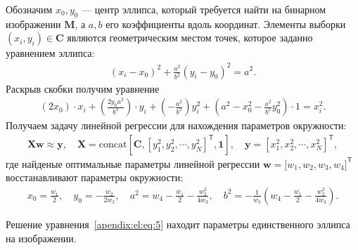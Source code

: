 \documentclass[12pt, twoside]{article}
\numberwithin{equation}{section}
\begin{document}
Обозначим $x_0, y_0$ --- центр эллипса, который требуется найти на бинарном изображении $\textbf{M}$, а $a, b$ его коэффициенты вдоль координат. Элементы выборки $\left(x_i, y_i\right)\in\textbf{C}$ являются геометрическим местом точек, которое заданно уравнением эллипса:
\begin{equation}
\label{apendix:el:eq:3}
\begin{aligned}
\left(x_i - x_0\right)^{2}+\frac{a^2}{b^2}\left(y_i-y_0\right)^2 = a^2.
\end{aligned}
\end{equation}
Раскрыв скобки получим уравнение
\begin{equation}
\label{apendix:el:eq:4}
\begin{aligned}
\left(2x_0\right)\cdot x_i + \left(\frac{2y_0a^2}{b^2}\right)\cdot y_i + \left(-\frac{a^2}{b^2}\right)y_{i}^{2} + \left(a^2-x_0^2-\frac{a^2}{b^2}y_0^2\right)\cdot1 = x_{i}^2.
\end{aligned}
\end{equation}
Получаем задачу линейной регрессии для нахождения параметров окружности:
\begin{equation}
\label{apendix:el:eq:5}
\begin{aligned}
\textbf{X}\textbf{w} \approx \textbf{y},  \quad \textbf{X} = \text{concat}\left[\textbf{C}, \left[y_1^2, y_2^2, \cdots, y_N^2\right]^{\mathsf{T}}, \textbf{1}\right], \quad \textbf{y} = [x_1^2, x_2^2, \cdots, x_N^2]^{\mathsf{T}},
\end{aligned}
\end{equation}
где найденые оптимальные параметры линейной регрессии $\textbf{w} = \bigr[w_1, w_2, w_3, w_4\bigr]^{\mathsf{T}}$ восстанавливают параметры окружности:
\begin{equation}
\label{apendix:el:eq:6}
\begin{aligned}
x_0 = \frac{w_1}{2}, \quad y_0 = -\frac{w_2}{2w_3}, \quad a^2 = w_4-\frac{w_1}{2}-\frac{w_2^2}{4w_3}, \quad b^2 = -\frac{1}{w_3}\left(w_4-\frac{w_1}{2}-\frac{w_2^2}{4w_3}\right).
\end{aligned}
\end{equation}

Решение уравнения~\eqref{apendix:el:eq:5} находит параметры единственного эллипса на изображении.
\end{document}
